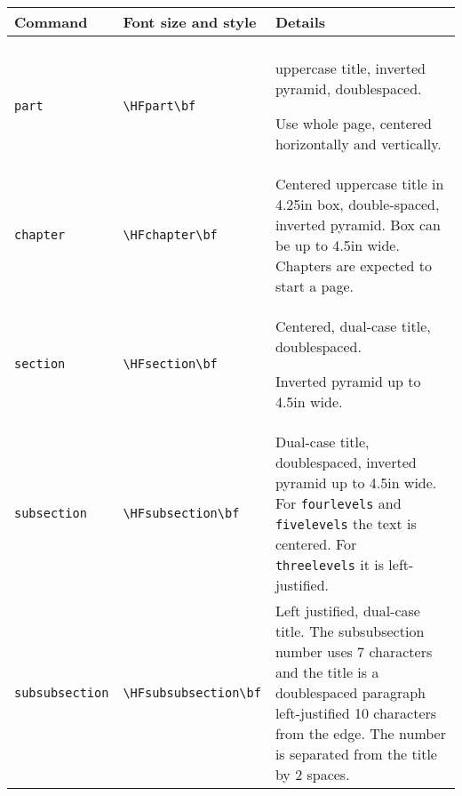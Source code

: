\begin{center}
\def\sm{\footnotesize}
\begin{tabular}{@{}p{1.2in}p{1.55in}p{3.2in}@{}}
Command & Font size and style  &  Details \\
\hline
\\
\tt part         &\sm \verb"\HFpart\bf"  & uppercase title, inverted
                                          pyramid, doublespaced.\par
                                          Use whole page, centered
                                          horizontally and vertically.\\
\tt chapter      &\sm  \verb"\HFchapter\bf"  & Centered uppercase title in
                                          4.25in box, double-spaced,
                                          inverted pyramid. Box can be
                                          up to 4.5in wide. Chapters are
                                          expected to start a page. \\
\tt section     &\sm \verb"\HFsection\bf"   & Centered, dual-case title,
                                          doublespaced.\par Inverted
                                          pyramid up to
                                          4.5in wide. \\
\tt subsection &\sm \verb"\HFsubsection\bf" &Dual-case title,
                                             doublespaced, inverted
                                             pyramid up to 4.5in wide.
                                             For {\tt fourlevels} and
                                             {\tt fivelevels} the text
                                             is centered. For {\tt
                                             threelevels} it is
                                             left-justified.
                                             \\
\tt subsubsection&\sm\verb"\HFsubsubsection\bf" & Left justified, dual-case
                                             title. The subsubsection
                                             number uses 7 characters
                                             and the title is a
                                             doublespaced paragraph
                                             left-justified 10
                                             characters from the edge.
                                             The number is separated
                                             from the title by 2 spaces.

\end{tabular}
\end{center}
